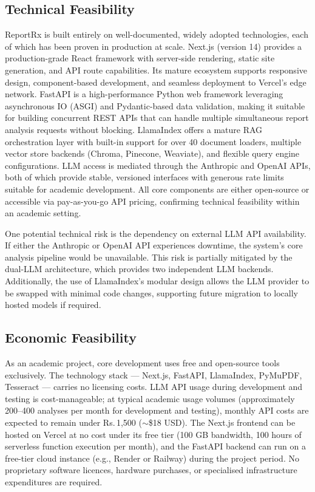 \documentclass[12pt,a4paper]{report}
\begin{document}
\subsection{Technical Feasibility}
ReportRx is built entirely on well-documented, widely adopted technologies, each of which has been proven in production at scale. Next.js (version 14) provides a production-grade React framework with server-side rendering, static site generation, and API route capabilities. Its mature ecosystem supports responsive design, component-based development, and seamless deployment to Vercel's edge network. FastAPI is a high-performance Python web framework leveraging asynchronous IO (ASGI) and Pydantic-based data validation, making it suitable for building concurrent REST APIs that can handle multiple simultaneous report analysis requests without blocking. LlamaIndex offers a mature RAG orchestration layer with built-in support for over 40 document loaders, multiple vector store backends (Chroma, Pinecone, Weaviate), and flexible query engine configurations. LLM access is mediated through the Anthropic and OpenAI APIs, both of which provide stable, versioned interfaces with generous rate limits suitable for academic development. All core components are either open-source or accessible via pay-as-you-go API pricing, confirming technical feasibility within an academic setting.

One potential technical risk is the dependency on external LLM API availability. If either the Anthropic or OpenAI API experiences downtime, the system's core analysis pipeline would be unavailable. This risk is partially mitigated by the dual-LLM architecture, which provides two independent LLM backends. Additionally, the use of LlamaIndex's modular design allows the LLM provider to be swapped with minimal code changes, supporting future migration to locally hosted models if required.

\subsection{Economic Feasibility}
As an academic project, core development uses free and open-source tools exclusively. The technology stack --- Next.js, FastAPI, LlamaIndex, PyMuPDF, Tesseract --- carries no licensing costs. LLM API usage during development and testing is cost-manageable; at typical academic usage volumes (approximately 200--400 analyses per month for development and testing), monthly API costs are expected to remain under Rs.\,1,500 ($\sim$\$18 USD). The Next.js frontend can be hosted on Vercel at no cost under its free tier (100 GB bandwidth, 100 hours of serverless function execution per month), and the FastAPI backend can run on a free-tier cloud instance (e.g., Render or Railway) during the project period. No proprietary software licences, hardware purchases, or specialised infrastructure expenditures are required.
\end{document}
